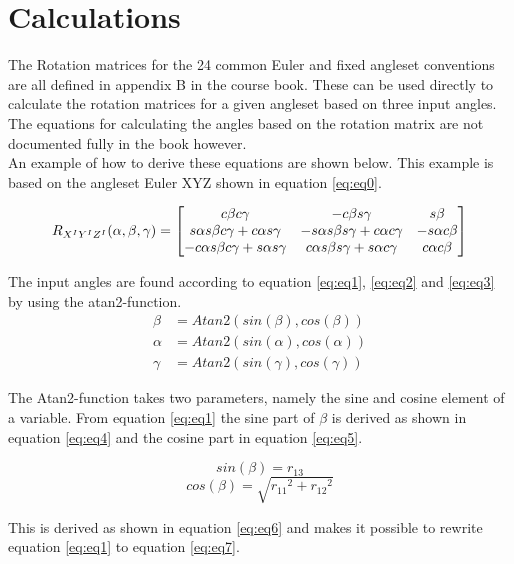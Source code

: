 \section{Calculations}
\label{sec:calc}
The Rotation matrices for the 24 common Euler and fixed angleset conventions are all defined in appendix B in the course book\cite{bib1}. These can be used directly to calculate the rotation matrices for a given angleset based on three input angles. The equations for calculating the angles based on the rotation matrix are not documented fully in the book however.\\

An example of how to derive these equations are shown below. This example is based on the  angleset Euler XYZ shown in equation \eqref{eq:eq0}. 

\begin{equation}
R_{{X^I}{Y^I}{Z^I}}(\alpha,\beta,\gamma) =
\begin{bmatrix}
c\beta c\gamma & -c\beta s\gamma & s\beta \\
s\alpha s\beta c\gamma + c\alpha s\gamma & -s\alpha s\beta s\gamma + c\alpha c\gamma & -s\alpha c\beta \\
-c\alpha s\beta c\gamma + s\alpha s\gamma & c\alpha s\beta s\gamma + s\alpha c\gamma & c\alpha c\beta
\end{bmatrix}
\label{eq:eq0}
\end{equation}


The input angles are found according to equation \eqref{eq:eq1}, \eqref{eq:eq2} and \eqref{eq:eq3} by using the atan2-function.
\begin{align}
\beta  &= Atan2(sin(\beta ),cos(\beta ))   \label{eq:eq1} \\
\alpha &= Atan2(sin(\alpha ),cos(\alpha )) \label{eq:eq2} \\
\gamma &= Atan2(sin(\gamma ),cos(\gamma )) \label{eq:eq3}
\end{align}

The Atan2-function takes two parameters, namely the sine and cosine element of a variable. From equation \eqref{eq:eq1} the sine part of $\beta$ is derived as shown in equation \eqref{eq:eq4} and the cosine part in equation \eqref{eq:eq5}.

\begin{equation}
sin(\beta )=r_{13}
\label{eq:eq4}
\end{equation}
\begin{equation}
cos(\beta )=\sqrt{r{_{11}}^{2} + r{_{12}}^{2}}
\label{eq:eq5}
\end{equation}

This is derived as shown in equation \eqref{eq:eq6} and makes it possible to rewrite equation \eqref{eq:eq1} to equation \eqref{eq:eq7}.

